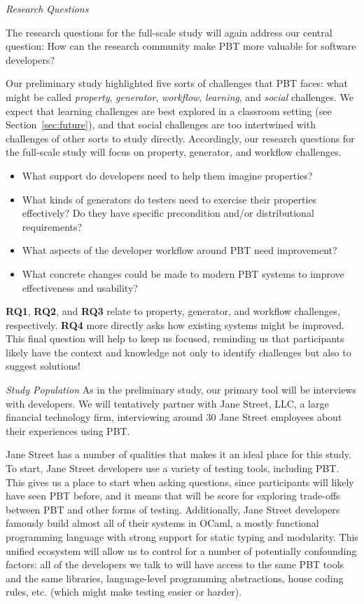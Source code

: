 \textit{Research Questions}

The research questions for the full-scale study will again address our central
question:
How can the research community make PBT more valuable
for software developers?

Our preliminary study highlighted five sorts of challenges that PBT
faces: what might be called {\em property}, {\em generator}, {\em workflow},
{\em learning}, and {\em social} challenges. We expect that
learning challenges are best explored in a classroom setting (see
Section~\ref{sec:future}), and that social challenges are too intertwined with
challenges of other sorts to study directly. Accordingly, our research
questions for the full-scale study will focus on property, generator, and workflow
challenges.
\begin{itemize}
\item[\bf RQ1.] What support do developers need to help them imagine properties?
\item[\bf RQ2.] What kinds of generators do testers need to exercise their
  properties effectively? Do they have specific precondition and/or distributional
  requirements?
\item[\bf RQ3.] What aspects of the developer workflow around PBT need improvement?
\item[\bf RQ4.] What concrete changes could be made to modern PBT systems
  to improve effectiveness and usability?
\end{itemize}
{\bf RQ1}, {\bf RQ2}, and {\bf RQ3} relate to property,
generator, and workflow challenges, respectively.
{\bf RQ4} more directly asks how existing systems might
be improved. This final question will help to keep us focused,
reminding us that participants likely have the context and knowledge not
only to identify challenges but also to suggest
solutions!

\textit{Study Population}
As in the preliminary study, our primary tool will be interviews with
developers. We will tentatively partner with Jane Street, LLC, a large
financial technology firm,
interviewing around 30 Jane Street employees about their experiences using PBT.

Jane Street has a number of qualities that makes it an ideal place for
this study. To start, Jane Street developers use
a variety of testing tools, including PBT. This gives us a place to start
when asking questions, since participants will likely have seen PBT before,
and it means that will be score for exploring trade-offs between PBT and
other forms of testing.
Additionally, Jane Street developers famously build almost all of their
systems in OCaml, a mostly functional programming language with strong support
for static typing and modularity. This unified ecosystem
will allow
us to control for a number of potentially confounding factors: all of the
developers we talk to will have access to the same PBT tools and the same
libraries, language-level programming abstractions, house coding rules,
etc. (which might make testing easier or harder).

